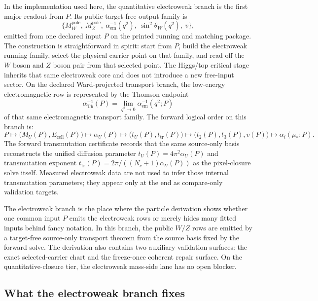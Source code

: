 \documentclass[11pt]{article}
\begin{document}
In the implementation used here, the quantitative electroweak branch is the first major readout from \(P\). Its public
target-free output family is
\[
\{M_W^{\mathrm{pole}},\ M_Z^{\mathrm{pole}},\ \alpha_{\mathrm{em}}^{-1}(q^2),\ \sin^2\theta_W(q^2),\ v\},
\]
emitted from one declared input \(P\) on the printed running and matching package. The construction
is straightforward in spirit: start from \(P\), build the electroweak running family, select the physical carrier point on that family, and read off the \(W\) boson and \(Z\) boson pair from that selected point. The Higgs/top critical stage
inherits that same electroweak core and does not introduce a new
free-input sector. On the declared Ward-projected transport branch, the low-energy electromagnetic row is represented by the Thomson endpoint
\[
\alpha_{\mathrm{Th}}^{-1}(P)=\lim_{q^2\to 0}\alpha_{\mathrm{em}}^{-1}(q^2;P)
\]
of that same electromagnetic transport family.
The forward logical order on this branch is:
\[
P
\longmapsto
\bigl(M_U(P),E_{\mathrm{cell}}(P)\bigr)
\longmapsto
\alpha_U(P)
\longmapsto
\bigl(t_U(P),t_{\mathrm{tr}}(P)\bigr)
\longmapsto
\bigl(t_2(P),t_3(P),v(P)\bigr)
\longmapsto
\alpha_i(\mu_\ast;P).
\]
The forward transmutation certificate records that the same source-only basis reconstructs the unified diffusion parameter \(t_U(P)=4\pi^2\alpha_U(P)\) and transmutation exponent \(t_{\mathrm{tr}}(P)=2\pi/((N_c+1)\alpha_U(P))\) as the pixel-closure solve itself. Measured electroweak data are not used to infer those internal transmutation parameters; they appear only at the end as compare-only validation targets.

The electroweak branch is the place where the particle derivation
shows whether one common input \(P\) emits the electroweak rows or merely hides many fitted
inputs behind fancy notation. In this branch, the public \(W/Z\) rows are emitted by a
target-free source-only transport theorem from the source basis fixed by the forward solve. The
derivation also contains two
auxiliary validation surfaces: the exact selected-carrier chart and the freeze-once coherent repair
surface. On the quantitative-closure tier, the electroweak mass-side lane has no open blocker.

\subsection{What the electroweak branch fixes}
\end{document}
